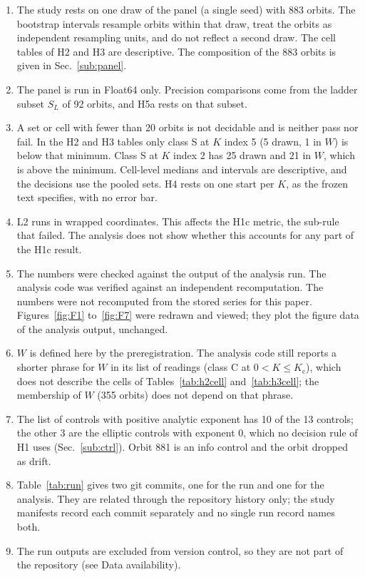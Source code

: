 \documentclass[aip,cha,reprint,amsmath,amssymb,longbibliography]{revtex4-2}
\newcommand{\Kc}{\ensuremath{K_{\mathrm{c}}}}
\newcommand{\Sec}[1]{Sec.~\ref{#1}}
\begin{document}
\begin{enumerate}
\item The study rests on one draw of the panel (a single seed) with 883 orbits.
The bootstrap intervals resample orbits within that draw, treat the orbits as independent resampling units, and do not reflect a second draw.
The cell tables of H2 and H3 are descriptive.
The composition of the 883 orbits is given in \Sec{sub:panel}.
\item The panel is run in Float64 only.
Precision comparisons come from the ladder subset $S_L$ of 92 orbits, and H5a rests on that subset.
\item A set or cell with fewer than 20 orbits is not decidable and is neither pass nor fail.
In the H2 and H3 tables only class S at $K$ index 5 (5 drawn, 1 in $W$) is below that minimum.
Class S at $K$ index 2 has 25 drawn and 21 in $W$, which is above the minimum.
Cell-level medians and intervals are descriptive, and the decisions use the pooled sets.
H4 rests on one start per $K$, as the frozen text specifies, with no error bar.
\item L2 runs in wrapped coordinates.
This affects the H1c metric, the sub-rule that failed.
The analysis does not show whether this accounts for any part of the H1c result.
\item The numbers were checked against the output of the analysis run.
The analysis code was verified against an independent recomputation.
The numbers were not recomputed from the stored series for this paper.
Figures~\ref{fig:F1} to~\ref{fig:F7} were redrawn and viewed; they plot the figure data of the analysis output, unchanged.
\item $W$ is defined here by the preregistration.
The analysis code still reports a shorter phrase for $W$ in its list of readings (class C at $0<K\le\Kc$), which does not describe the cells of Tables~\ref{tab:h2cell} and~\ref{tab:h3cell}; the membership of $W$ (355 orbits) does not depend on that phrase.
\item The list of controls with positive analytic exponent has 10 of the 13 controls; the other 3 are the elliptic controls with exponent 0, which no decision rule of H1 uses (\Sec{sub:ctrl}).
Orbit 881 is an info control and the orbit dropped as drift.
\item Table~\ref{tab:run} gives two git commits, one for the run and one for the analysis.
They are related through the repository history only; the study manifests record each commit separately and no single run record names both.
\item The run outputs are excluded from version control, so they are not part of the repository (see Data availability).

\end{enumerate}
\end{document}
